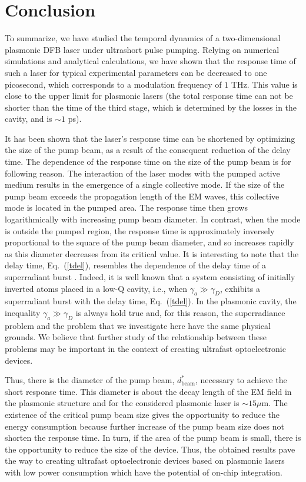 \documentclass[aps,pra,amsmath,amssymb,onecolumn,superscriptaddress,showpacs,floatfix,]{revtex4-1}
\begin{document}
\section*{Conclusion}

To summarize, we have studied the temporal dynamics of a two-dimensional plasmonic DFB laser under ultrashort pulse pumping.
Relying on numerical simulations and analytical calculations, we have shown that the response time of such a laser for typical experimental parameters can be decreased to one picosecond, which corresponds to a modulation frequency of $1$ THz.
This value is close to the upper limit for plasmonic lasers (the total response time can not be shorter than the time of the third stage, which is determined by the losses in the cavity, and is $ \sim 1$ ps).

It has been shown that the laser's response time can be shortened by optimizing the size of the pump beam, as a result of the consequent reduction of the delay time.
The dependence of the response time on the size of the pump beam is for following reason.
The interaction of the laser modes with the pumped active medium results in the emergence of a single collective mode.
If the size of the pump beam exceeds the propagation length of the EM waves, this collective mode is located in the pumped area.
The response time then grows logarithmically with increasing pump beam diameter.
In contrast, when the mode is outside the pumped region, the response time is approximately inversely proportional to the square of the pump beam diameter, and so increases rapidly as this diameter decreases from its critical value.
It is interesting to note that the delay time, Eq.~(\ref{tdel}), resembles the dependence of the delay time of a superradiant burst \cite{gross1982superradiance, andreev1980collective,nefedkin2017badcavitySR}.
Indeed, it is well known \cite{gross1982superradiance, andreev1980collective} that a system consisting of initially inverted atoms placed in a low-Q cavity, i.e., when $\gamma_a \gg \gamma_D$, exhibits a superradiant burst with the delay time, Eq.~(\ref{tdel}). In the plasmonic cavity, the inequality $\gamma_a \gg \gamma_D$ is always hold true and, for this reason, the superradiance problem and the problem that we investigate here have the same physical grounds. We believe that further study of the relationship between these problems may be important in the context of creating ultrafast optoelectronic devices.

Thus, there is the diameter of the pump beam, $d_{\text{beam}}^*$, necessary to achieve the short response time. This diameter is about the decay length of the EM field in the plasmonic structure and for the considered plasmonic laser is $\sim 15 \mu$m. The existence of the critical pump beam size gives the opportunity to reduce the energy consumption because further increase of the pump beam size does not shorten the response time.
In turn, if the area of the pump beam is small, there is the opportunity to reduce the size of the device.
Thus, the obtained results pave the way to creating ultrafast optoelectronic devices based on plasmonic lasers with low power consumption which have the potential of on-chip integration.
\end{document}
